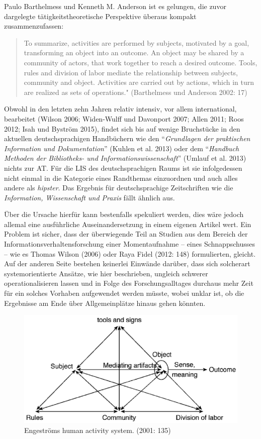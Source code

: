 \documentclass[a4paper,
fontsize=11pt,
oneside,
numbers=noperiodatend,
parskip=half-,
bibliography=totoc,
final
]{scrartcl}
\begin{document}
Paulo Barthelmess und Kenneth M. Anderson ist es gelungen, die zuvor
dargelegte tätigkeitstheoretische Perspektive überaus kompakt
zusammenzufassen:

\begin{quote}
To summarize, activities are performed by subjects, motivated by a goal,
transforming an object into an outcome. An object may be shared by a
community of actors, that work together to reach a desired outcome.
Tools, rules and division of labor mediate the relationship between
subjects, community and object. Activities are carried out by actions,
which in turn are realized as sets of operations." (Barthelmess und
Anderson 2002: 17)
\end{quote}

Obwohl in den letzten zehn Jahren relativ intensiv, vor allem
international, bearbeitet (Wilson 2006; Widen-Wulff und Davonport 2007;
Allen 2011; Roos 2012; Isah und Byström 2015), findet sich bis auf
wenige Bruchstücke in den aktuellen deutschsprachigen Handbüchern wie
den \enquote{\emph{Grundlagen der praktischen Information und
Dokumentation}} (Kuhlen et al. 2013) oder dem \enquote{\emph{Handbuch
Methoden der Bibliotheks- und Informationswissenschaft}} (Umlauf et al.
2013) nichts zur AT. Für die LIS des deutschsprachigen Raums ist sie
infolgedessen nicht einmal in die Kategorie eines Randthemas einzuordnen
und auch alles andere als \emph{hipster}. Das Ergebnis für
deutschsprachige Zeitschriften wie die \emph{Information, Wissenschaft
und Praxis} fällt ähnlich aus.

Über die Ursache hierfür kann bestenfalls spekuliert werden, dies wäre
jedoch allemal eine ausführliche Auseinandersetzung in einem eigenen
Artikel wert. Ein Problem ist sicher, dass der überwiegende Teil an
Studien aus dem Bereich der Informationsverhaltensforschung einer
Momentaufnahme -- eines Schnappschusses -- wie es Thomas Wilson (2006)
oder Raya Fidel (2012: 148) formulierten, gleicht. Auf der anderen Seite
bestehen keinerlei Einwände darüber, dass sich solcherart
systemorientierte Ansätze, wie hier beschrieben, ungleich schwerer
operationalisieren lassen und in Folge des Forschungsalltages durchaus
mehr Zeit für ein solches Vorhaben aufgewendet werden müsste, wobei
unklar ist, ob die Ergebnisse am Ende über Allgemeinplätze hinaus gehen
könnten.

\begin{figure}[htbp]
\centering
\includegraphics{img/abbildung1.png}
\caption{Engeströms human activity system. (2001: 135)}
\end{figure}
\end{document}
